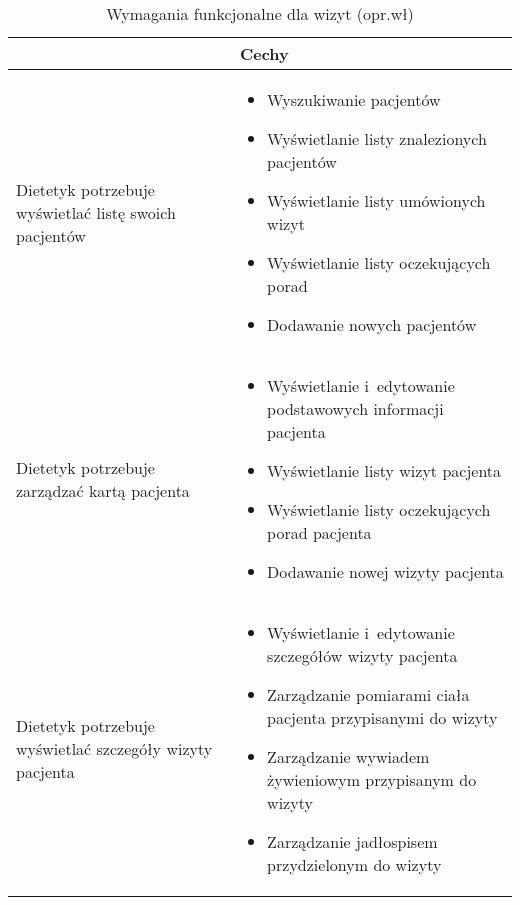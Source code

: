 \begin{minipage}{\textwidth}
    \begin{table}[H]
        \centering\caption{Wymagania funkcjonalne dla wizyt (opr.wł)\label{tabela:wymaganiaFunkcjonalneWizyty}}
        \begin{tabular}{|P{.3\textwidth}|P{.6\textwidth}|}
            \hline
             & Cechy \\

            \hline
            Dietetyk potrzebuje wyświetlać listę swoich pacjentów &
            \begin{itemize}
                \item Wyszukiwanie pacjentów
                \item Wyświetlanie listy znalezionych pacjentów
                \item Wyświetlanie listy umówionych wizyt
                \item Wyświetlanie listy oczekujących porad
                \item Dodawanie nowych pacjentów
            \end{itemize} \\
            \hline
            Dietetyk potrzebuje zarządzać kartą pacjenta &
            \begin{itemize}
                \item Wyświetlanie i~edytowanie podstawowych informacji pacjenta
                \item Wyświetlanie listy wizyt pacjenta
                \item Wyświetlanie listy oczekujących porad pacjenta
                \item Dodawanie nowej wizyty pacjenta
            \end{itemize} \\
            \hline
            Dietetyk potrzebuje wyświetlać szczegóły wizyty pacjenta &
            \begin{itemize}
                \item Wyświetlanie i~edytowanie szczegółów wizyty pacjenta
                \item Zarządzanie pomiarami ciała pacjenta przypisanymi do wizyty
                \item Zarządzanie wywiadem żywieniowym przypisanym do wizyty
                \item Zarządzanie jadłospisem przydzielonym do wizyty
            \end{itemize} \\

\end{tabular}
\end{table}
\end{minipage}
